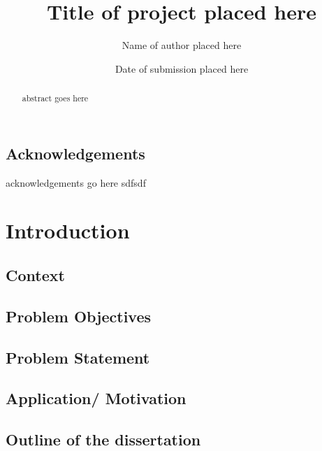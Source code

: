\documentclass{mproj}
\begin{document}
\title{Title of project placed here}
\author{Name of author placed here}
\date{Date of submission placed here}
\maketitle

\begin{abstract}
abstract goes here
\end{abstract}

\educationalconsent


\newpage
\section*{Acknowledgements}

acknowledgements go here sdfsdf

\tableofcontents

\chapter{Introduction}\label{intro}
\section{Context}
\section{Problem Objectives}
\section{Problem Statement}
\section{Application/ Motivation}
\section{Outline of the dissertation}
\end{document}
